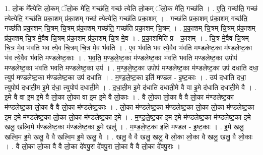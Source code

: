 \documentclass[17pt]{extarticle}
\begin{document}
1. लो॒क मे᳚त्येति लो॒कम् ॅलो॒क मे॑ति॒ गच्छ॑ति॒ गच्छ॑ त्येति लो॒कम् ॅलो॒क मे॑ति॒ गच्छ॑ति । . ए॒ति॒ गच्छ॑ति॒ गच्छ॑ त्येत्येति॒ गच्छ॑ति प्रका॒शम् प्र॑का॒शम् गच्छ॑ त्येत्येति॒ गच्छ॑ति प्रका॒शम् । . गच्छ॑ति प्रका॒शम् प्र॑का॒शम् गच्छ॑ति॒ गच्छ॑ति प्रका॒शम् चि॒त्रम् चि॒त्रम् प्र॑का॒शम् गच्छ॑ति॒ गच्छ॑ति प्रका॒शम् चि॒त्रम् । . प्र॒का॒शम् चि॒त्रम् चि॒त्रम् प्र॑का॒शम् प्र॑का॒शम् चि॒त्र मे॒वैव चि॒त्रम् प्र॑का॒शम् प्र॑का॒शम् चि॒त्र मे॒व । . प्र॒का॒शमिति॑ प्र - का॒शम् । . चि॒त्र मे॒वैव चि॒त्रम् चि॒त्र मे॒व भ॑वति भव त्ये॒व चि॒त्रम् चि॒त्र मे॒व भ॑वति । . ए॒व भ॑वति भव त्ये॒वैव भ॑वति मण्डलेष्ट॒का म॑ण्डलेष्ट॒का भ॑व त्ये॒वैव भ॑वति मण्डलेष्ट॒काः । . भ॒व॒ति॒ म॒ण्ड॒ले॒ष्ट॒का म॑ण्डलेष्ट॒का भ॑वति भवति मण्डलेष्ट॒का उपोप॑ मण्डलेष्ट॒का भ॑वति भवति मण्डलेष्ट॒का उप॑ । . म॒ण्ड॒ले॒ष्ट॒का उपोप॑ मण्डलेष्ट॒का म॑ण्डलेष्ट॒का उप॑ दधाति दधा॒ त्युप॑ मण्डलेष्ट॒का म॑ण्डलेष्ट॒का उप॑ दधाति । . म॒ण्ड॒ले॒ष्ट॒का इति॑ मण्डल - इ॒ष्ट॒काः । . उप॑ दधाति दधा॒ त्युपोप॑ दधाती॒म इ॒मे द॑धा॒ त्युपोप॑ दधाती॒मे । . द॒धा॒ती॒म इ॒मे द॑धाति दधाती॒मे वै वा इ॒मे द॑धाति दधाती॒मे वै । . इ॒मे वै वा इ॒म इ॒मे वै लो॒का लो॒का वा इ॒म इ॒मे वै लो॒काः । . वै लो॒का लो॒का वै वै लो॒का म॑ण्डलेष्ट॒का म॑ण्डलेष्ट॒का लो॒का वै वै लो॒का म॑ण्डलेष्ट॒काः । . लो॒का म॑ण्डलेष्ट॒का म॑ण्डलेष्ट॒का लो॒का लो॒का म॑ण्डलेष्ट॒का इ॒म इ॒मे म॑ण्डलेष्ट॒का लो॒का लो॒का म॑ण्डलेष्ट॒का इ॒मे । . म॒ण्ड॒ले॒ष्ट॒का इ॒म इ॒मे म॑ण्डलेष्ट॒का म॑ण्डलेष्ट॒का इ॒मे खलु॒ खल्वि॒मे म॑ण्डलेष्ट॒का म॑ण्डलेष्ट॒का इ॒मे खलु॑ । . म॒ण्ड॒ले॒ष्ट॒का इति॑ मण्डल - इ॒ष्ट॒काः । . इ॒मे खलु॒ खल्वि॒म इ॒मे खलु॒ वै वै खल्वि॒म इ॒मे खलु॒ वै । . खलु॒ वै वै खलु॒ खलु॒ वै लो॒का लो॒का वै खलु॒ खलु॒ वै लो॒काः । . वै लो॒का लो॒का वै वै लो॒का दे॑वपु॒रा दे॑वपु॒रा लो॒का वै वै लो॒का दे॑वपु॒राः । \newline
\end{document}
